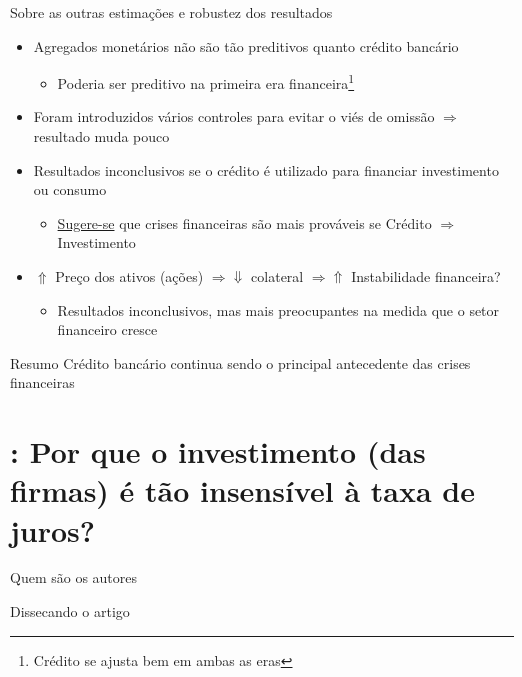 \documentclass[presentation]{beamer}
\begin{document}
\begin{frame}[label={sec:orge3ab564}]{Sobre as outras estimações e robustez dos resultados}
\begin{itemize}
\item Agregados monetários não são tão preditivos quanto crédito bancário
\begin{itemize}
\item Poderia ser preditivo na primeira era financeira\footnote{Crédito se ajusta bem em ambas as eras}
\end{itemize}
\item Foram introduzidos vários controles para evitar o viés de omissão \(\Rightarrow\) resultado muda pouco
\item Resultados inconclusivos se o crédito é utilizado para financiar investimento ou consumo
\begin{itemize}
\item \uline{Sugere-se} que crises financeiras são mais prováveis se Crédito \(\Rightarrow\) Investimento
\end{itemize}
\item \(\Uparrow\) Preço dos ativos (ações) \(\Rightarrow \Downarrow\) colateral \(\Rightarrow \Uparrow\) Instabilidade financeira?
\begin{itemize}
\item Resultados inconclusivos, mas mais preocupantes na medida que o setor financeiro cresce
\end{itemize}
\end{itemize}


\begin{block}{Resumo}
Crédito bancário continua sendo o principal antecedente das crises financeiras
\end{block}
\end{frame}

\section{\textcite{sharpe_2020_Why}: Por que o investimento (das firmas) é tão insensível à taxa de juros?}
\label{sec:org22dcfe2}

\begin{frame}[label={sec:org2fa9063}]{Quem são os autores}
\end{frame}

\begin{frame}[label={sec:orgd41adf3}]{Dissecando o artigo}
\end{frame}
\end{document}
